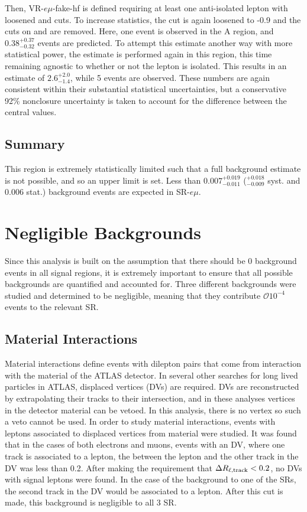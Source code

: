 Then, VR-$e\mu$-fake-hf is defined requiring at least one anti-isolated lepton with loosened \pt and \absdz cuts. To increase statistics, the \dpt cut is again loosened to -0.9 and the cuts on \nprecision and \nphi are removed. Here, one event is observed in the A region, and $0.38^{+0.37}_{-0.32}$ events are predicted. To attempt this estimate another way with more statistical power, the estimate is performed again in this region, this time remaining agnostic to whether or not the lepton is isolated. This results in an estimate of $2.6^{+2.0}_{-1.4}$, while 5 events are observed. These numbers are again consistent within their substantial statistical uncertainties, but a conservative 92\% nonclosure uncertainty is taken to account for the difference between the central values.

\subsection{Summary}
This region is extremely statistically limited such that a full background estimate is not possible, and so an upper limit is set. Less than 
$0.007^{+0.019}_{-0.011}$ ($^{+0.018}_{-0.009}$ syst. and 0.006 stat.) background events are expected in SR-$e\mu$.
 


\section{Negligible Backgrounds}
Since this analysis is built on the assumption that there should be 0 background events in all signal regions, it is extremely important to ensure that all possible backgrounds are quantified and accounted for. Three different backgrounds were studied and determined to be negligible, meaning that they contribute $\mathcal{O}10^{-4}$ events to the relevant \ac{SR}. 

\subsection{Material Interactions}

Material interactions define events with dilepton pairs that come from interaction with the material of the \ac{ATLAS} detector. In several other searches for long lived particles in \ac{ATLAS}, displaced vertices (\acp{DV}) are required. \ac{DV}s are reconstructed by extrapolating their tracks to their intersection, and in these analyses vertices in the detector material can be vetoed. In this analysis, there is no vertex so such a veto cannot be used. In order to study material interactions, events with leptons associated to displaced vertices from material were studied. It was found that in the cases of both electrons and muons, events with an \ac{DV}, where one track is associated to a lepton, the \dR between the lepton and the other track in the \ac{DV} was less than 0.2. After making the requirement that $\Delta R_{\ell, \text{track}} < 0.2$, no \acp{DV} with signal leptons were found. In the case of the background to one of the \acp{SR}, the second track in the \ac{DV} would be associated to a lepton. After this cut is made, this background is negligible to all 3 \ac{SR}.


